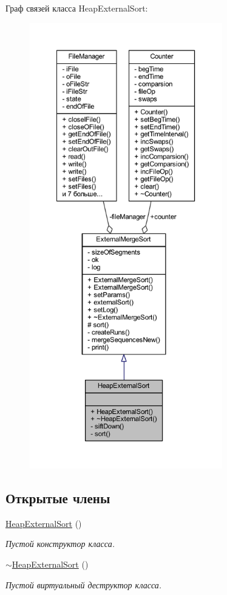 Граф связей класса Heap\+External\+Sort\+:\nopagebreak
\begin{figure}[H]
\begin{center}
\leavevmode
\includegraphics[height=550pt]{class_heap_external_sort__coll__graph}
\end{center}
\end{figure}
\subsection*{Открытые члены}
\begin{DoxyCompactItemize}
\item 
\hyperlink{class_heap_external_sort_a9e6236e47430f0b530b287a6d7cf3a8b}{Heap\+External\+Sort} ()
\begin{DoxyCompactList}\small\item\em Пустой конструктор класса. \end{DoxyCompactList}\item 
\hyperlink{class_heap_external_sort_afa76473510a8cb610bb94bca5b5202c9}{$\sim$\+Heap\+External\+Sort} ()
\begin{DoxyCompactList}\small\item\em Пустой виртуальный деструктор класса. \end{DoxyCompactList}\end{DoxyCompactItemize}
